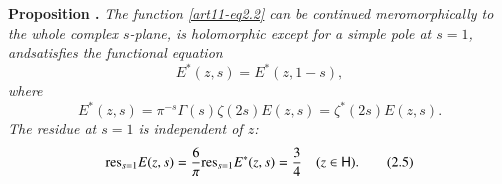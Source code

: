 \medskip
\noindent
{\bfseries Proposition .\label{art11-prop1}} 
\textit{The function \eqref{art11-eq2.2} can be continued meromorphically to the whole complex $s$-plane, is holomorphic except for a simple pole at $s =1$, and\pageoriginale satisfies the functional equation}
\begin{equation*}
E^{\ast} (z,s) = E^\ast (z, 1-s), \tag{2.3}\label{art11-eq2.3}
\end{equation*}
\textit{where}
\begin{equation*}
E^\ast (z,s) = \pi^{-s} \Gamma (s) \zeta(2s) E (z,s) = \zeta^\ast (2s) E (z,s). \tag{2.4} \label{art11-eq2.4}
\end{equation*}
\textit{The residue at $s =1$ is independent of $z$:}
\begin{equation*}
\mathrm{res}_{s=1} E(z,s) = \frac{6}{\pi} \mathrm{res}_{s =1} E^\ast (z,s) = \frac{3}{4} \quad (z \in \mathsf{H}). \tag{2.5} \label{art11-eq2.5}
\end{equation*}

